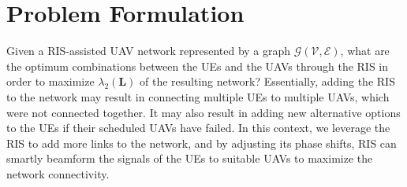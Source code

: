 \documentclass[conference]{IEEEtran}
\begin{document}






\section{Problem Formulation}

Given a RIS-assisted UAV network represented by a graph $\mathcal G(\mathcal V, \mathcal E)$, what are the optimum combinations between the UEs and the UAVs through the RIS in order to maximize $\lambda_2 (\mathbf L)$ of the resulting network? 
Essentially, adding the RIS to the network may result in connecting multiple UEs to multiple UAVs, which were not connected together. It may also result in adding new alternative options to the UEs if their scheduled UAVs have failed. In this context, we leverage the RIS to add more links to the network, and by adjusting its phase shifts, RIS can smartly beamform the signals of the UEs to suitable UAVs to maximize the network connectivity. %
\end{document}
